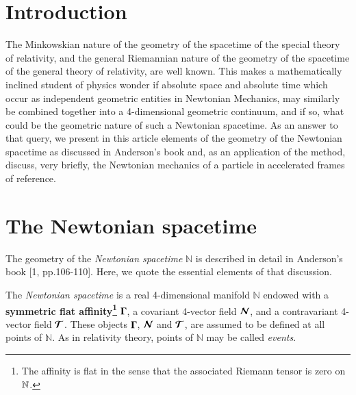 \section{Introduction}\label{chap16-sec1}

The Minkowskian nature of the geometry of the spacetime of the special theory of relativity, and the general Riemannian nature of the geometry of the spacetime of the general theory of relativity, are well known. This makes a mathematically inclined student of physics  wonder if absolute space and absolute time which occur as independent geometric entities in Newtonian Mechanics, may similarly be combined together into a 4-dimensional geometric continuum, and if so, what could be the geometric nature of such a  Newtonian spacetime. As an  answer to that query, we present in this article elements of the geometry of the Newtonian spacetime as discussed in Anderson's book \cite{chap16-key1} and, as an application of the method, discuss, very briefly, the Newtonian mechanics of a particle in accelerated frames of reference.

\section{The Newtonian spacetime}\label{chap16-sec2}

The geometry of the \textsl{Newtonian spacetime} $\mathbb{N}$ is described in detail in Anderson's book [1, pp.106-110]. Here, we quote  the essential elements of that discussion.

The \textsl{Newtonian spacetime} is a real 4-dimensional manifold  $\mathbb{N}$ endowed with a \textbf{symmetric flat affinity\footnote{The affinity is flat in the sense that the associated Riemann tensor is zero on $\mathbb{N}$.}} $\mathbf{\Gamma}$, a covariant 4-vector field $\bm{\mathcal{N}}$,  and a contravariant 4-vector field  $\bm{\mathcal{T}}$. These objects $\mathbf{\Gamma}$, $\bm{\mathcal{N}}$ and $\bm{\mathcal{T}}$, are assumed to be defined   at all points of $\mathbb{N}$. As in relativity theory, points of $\mathbb{N}$ may be  called \textsl{events}. 

